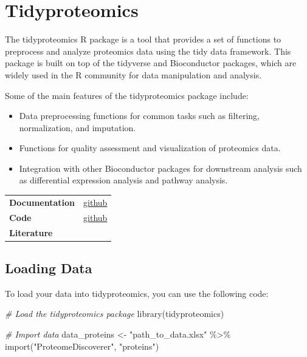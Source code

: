 \documentclass[
]{book}
\newenvironment{Shaded}{\begin{snugshade}}{\end{snugshade}}
\newcommand{\CommentTok}[1]{\textcolor[rgb]{0.56,0.35,0.01}{\textit{#1}}}
\newcommand{\FunctionTok}[1]{\textcolor[rgb]{0.00,0.00,0.00}{#1}}
\newcommand{\NormalTok}[1]{#1}
\newcommand{\OtherTok}[1]{\textcolor[rgb]{0.56,0.35,0.01}{#1}}
\newcommand{\SpecialCharTok}[1]{\textcolor[rgb]{0.00,0.00,0.00}{#1}}
\newcommand{\StringTok}[1]{\textcolor[rgb]{0.31,0.60,0.02}{#1}}
\providecommand{\tightlist}{%
  \setlength{\itemsep}{0pt}\setlength{\parskip}{0pt}}
\begin{document}
\hypertarget{tidyproteomics}{%
\section{Tidyproteomics}\label{tidyproteomics}}

The tidyproteomics R package is a tool that provides a set of functions to preprocess and analyze proteomics data using the tidy data framework. This package is built on top of the tidyverse and Bioconductor packages, which are widely used in the R community for data manipulation and analysis.

Some of the main features of the tidyproteomics package include:

\begin{itemize}
\tightlist
\item
  Data preprocessing functions for common tasks such as filtering, normalization, and imputation.
\item
  Functions for quality assessment and visualization of proteomics data.
\item
  Integration with other Bioconductor packages for downstream analysis such as differential expression analysis and pathway analysis.
\end{itemize}

\begin{longtable}[]{@{}
  >{\raggedright\arraybackslash}p{}
  >{\raggedright\arraybackslash}p{}@{}}
\toprule\noalign{}
\endhead
\bottomrule\noalign{}
\endlastfoot
\textbf{Documentation} & \href{https://jeffsocal.github.io/tidyproteomics/}{github} \\
\textbf{Code} & \href{https://github.com/jeffsocal/tidyproteomics}{github} \\
\textbf{Literature} & \\
\end{longtable}

\hypertarget{loading-data-1}{%
\subsection{Loading Data}\label{loading-data-1}}

To load your data into tidyproteomics, you can use the following code:

\begin{Shaded}
\begin{Highlighting}[]
\CommentTok{\# Load the tidyproteomics package}
\FunctionTok{library}\NormalTok{(tidyproteomics)}

\CommentTok{\# Import data}
\NormalTok{data\_proteins }\OtherTok{\textless{}{-}} \StringTok{"path\_to\_data.xlsx"} \SpecialCharTok{\%\textgreater{}\%}
   \FunctionTok{import}\NormalTok{(}\StringTok{"ProteomeDiscoverer"}\NormalTok{, }\StringTok{"proteins"}\NormalTok{) }
\end{Highlighting}
\end{Shaded}
\end{document}
